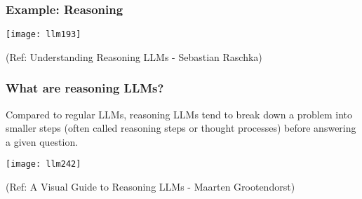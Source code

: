 \begin{frame}[fragile]\frametitle{Example: Reasoning}

		\begin{center}
		\texttt{[image: llm193]}
		
		{\tiny (Ref: Understanding Reasoning LLMs - Sebastian Raschka)}
		
		\end{center}
\end{frame}

\begin{frame}[fragile]\frametitle{What are reasoning LLMs?}

Compared to regular LLMs, reasoning LLMs tend to break down a problem into smaller steps (often called reasoning steps or thought processes) before answering a given question.

		\begin{center}
		\texttt{[image: llm242]}

		{\tiny (Ref: A Visual Guide to Reasoning LLMs - Maarten Grootendorst)}
		
		\end{center}
		
\end{frame}

